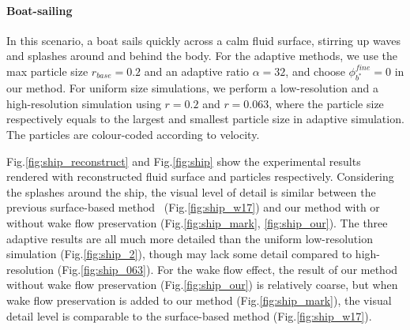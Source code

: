 \documentclass[VANCOUVER,STIX1COL]{WileyNJD-v2}
\begin{document}
\paragraph{Boat-sailing}

In this scenario, a boat sails quickly across a calm fluid surface, stirring up waves and splashes around and behind the body. For the adaptive methods, we use the max particle size $r_{base} = 0.2$ and an adaptive ratio $\alpha = 32$, and choose $\phi_{b^*}^{fine} = 0$ in our method. For uniform size simulations, we perform a low-resolution and a high-resolution simulation using $r = 0.2$ and $r = 0.063$, where the particle size respectively equals to the largest and smallest particle size in adaptive simulation. The particles are colour-coded according to velocity.

Fig.\ref{fig:ship_reconstruct} and Fig.\ref{fig:ship} show the experimental results rendered with reconstructed fluid surface and particles respectively. Considering the splashes around the ship, the visual level of detail is similar between the previous surface-based method~\cite{Winchenbach17} (Fig.\ref{fig:ship_w17}) and our method with or without wake flow preservation (Fig.\ref{fig:ship_mark}, \ref{fig:ship_our}). The three adaptive results are all much more detailed than the uniform low-resolution simulation (Fig.\ref{fig:ship_2}), though may lack some detail compared to high-resolution (Fig.\ref{fig:ship_063}). For the wake flow effect, the result of our method without wake flow preservation (Fig.\ref{fig:ship_our}) is relatively coarse, but when wake flow preservation is added to our method (Fig.\ref{fig:ship_mark}), the visual detail level is comparable to the surface-based method (Fig.\ref{fig:ship_w17}).

\end{document}
